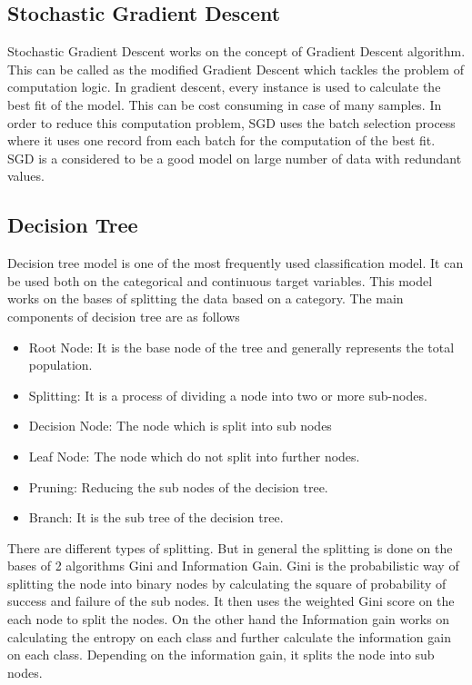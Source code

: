 \subsection{Stochastic Gradient Descent}
Stochastic Gradient Descent works on the concept of Gradient Descent algorithm. This can be called as the modified Gradient Descent which tackles the problem of computation logic. In gradient descent, every instance is used to calculate the best fit of the model. This can be cost consuming in case of many samples. In order to reduce this computation problem, SGD uses the batch selection process where it uses one record from each batch for the computation of the best fit. SGD is a considered to be a good model on large number of data with redundant values.

\subsection{Decision Tree}
Decision tree model is one of the most frequently used classification model. It can be used both on the categorical and continuous target variables. This model works on the bases of splitting the data based on a category. The main components of decision tree are as follows

\begin{itemize}
	\item Root Node: It is the base node of the tree and generally represents the total population.
	\item Splitting: It is a process of dividing a node into two or more sub-nodes.
	\item Decision Node: The node which is split into sub nodes
	\item Leaf Node: The node which do not split into further nodes.
	\item Pruning: Reducing the sub nodes of the decision tree.
	\item Branch: It is the sub tree of the decision tree.
\end{itemize}

There are different types of splitting. But in general the splitting is done on the bases of 2 algorithms Gini and Information Gain. Gini is the probabilistic way of splitting the node into binary nodes by calculating the square of probability of success and failure of the sub nodes. It then uses the weighted Gini score on the each node to split the nodes. On the other hand the Information gain works on calculating the entropy on each class and further calculate the information gain on each class. Depending on the information gain, it splits the node into sub nodes.

